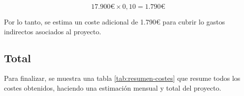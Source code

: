 \[ 17.900€ \times 0,10 = 1.790€ \]

Por lo tanto, se estima un coste adicional de 1.790€ para cubrir lo gastos indirectos asociados al proyecto.

\subsection{Total}

Para finalizar, se muestra una tabla \ref{tab:resumen-costes} que resume todos los costes obtenidos, haciendo una estimación mensual y total del proyecto.
\begin{table}[H]
    \centering
    \caption{Total de costes del proyecto}
    \label{tab:resumen-costes}
\end{table}

